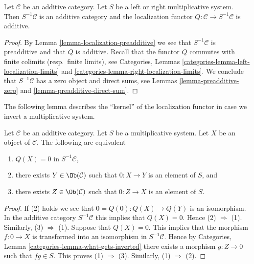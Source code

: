\begin{lemma}
\label{lemma-localization-additive}
Let $\mathcal{C}$ be an additive category.
Let $S$ be a left or right multiplicative system.
Then $S^{-1}\mathcal{C}$ is an additive category and the localization functor
$Q : \mathcal{C} \to S^{-1}\mathcal{C}$ is additive.
\end{lemma}

\begin{proof}
By
Lemma \ref{lemma-localization-preadditive}
we see that $S^{-1}\mathcal{C}$ is preadditive and that $Q$ is additive.
Recall that the functor $Q$ commutes with finite colimits
(resp.\ finite limits), see
Categories, Lemmas \ref{categories-lemma-left-localization-limits} and
\ref{categories-lemma-right-localization-limits}.
We conclude that $S^{-1}\mathcal{C}$ has a zero object and
direct sums, see
Lemmas \ref{lemma-preadditive-zero} and
\ref{lemma-preadditive-direct-sum}.
\end{proof}

\noindent
The following lemma describes the ``kernel''
of the localization functor in case we invert a multiplicative system.

\begin{lemma}
\label{lemma-kernel-localization}
Let $\mathcal{C}$ be an additive category. Let $S$ be a multiplicative
system. Let $X$ be an object
of $\mathcal{C}$. The following are equivalent
\begin{enumerate}
\item $Q(X) = 0$ in $S^{-1}\mathcal{C}$,
\item there exists $Y \in \Ob(\mathcal{C})$ such that
$0 : X \to Y$ is an element of $S$, and
\item there exists $Z \in \Ob(\mathcal{C})$ such that
$0 : Z \to X$ is an element of $S$.
\end{enumerate}
\end{lemma}

\begin{proof}
If (2) holds we see that $0 = Q(0) : Q(X) \to Q(Y)$ is an isomorphism.
In the additive category $S^{-1}\mathcal{C}$ this implies that $Q(X) = 0$.
Hence (2) $\Rightarrow$ (1). Similarly, (3) $\Rightarrow$ (1).
Suppose that $Q(X) = 0$. This implies that the morphism
$f : 0 \to X$ is transformed into an isomorphism in $S^{-1}\mathcal{C}$.
Hence by
Categories, Lemma \ref{categories-lemma-what-gets-inverted}
there exists a morphism $g : Z \to 0$ such that $fg \in S$. This proves
(1) $\Rightarrow$ (3). Similarly, (1) $\Rightarrow$ (2).
\end{proof}

